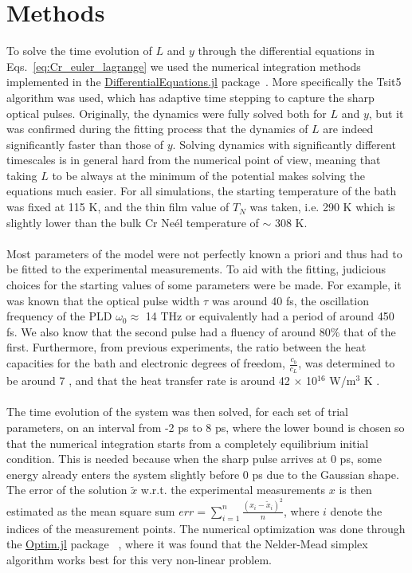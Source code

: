 \section{Methods}
To solve the time evolution of $L$ and $y$ through the differential equations in Eqs.~\ref{eq:Cr_euler_lagrange} we used the numerical integration methods implemented in the \href{https://github.com/SciML/DifferentialEquations.jl}{DifferentialEquations.jl} package~\cite{rackauckas2017differentialequations}. More specifically the Tsit5 algorithm was used, which has adaptive time stepping to capture the sharp optical pulses.
Originally, the dynamics were fully solved both for $L$ and $y$, but it was confirmed during the fitting process that the dynamics of $L$ are indeed significantly faster than those of $y$.
Solving dynamics with significantly different timescales is in general hard from the numerical point of view, meaning that taking $L$ to be always at the minimum of the potential makes solving the equations much easier.
For all simulations, the starting temperature of the bath was fixed at 115 K, and the thin film value of $T_N$ was taken, i.e. 290 K which is slightly lower than the bulk Cr Ne\'el temperature of $\sim$ 308 K.
\\\\
Most parameters of the model were not perfectly known a priori and thus had to be fitted to the experimental measurements.
To aid with the fitting, judicious choices for the starting values of some parameters were be made.
For example, it was known that the optical pulse width $\tau$ was around 40 fs, the oscillation frequency of the PLD $\omega_0 \approx$ 14 THz or equivalently had a period of around 450 fs.
We also know that the second pulse had a fluency of around 80\% that of the first.
Furthermore, from previous experiments, the ratio between the heat capacities for the bath and electronic degrees of freedom, $\frac{c_b}{c_L}$, was determined to be around 7 \cite{Nicholson2016}, and that the heat transfer rate is around 42 $\times$ 10$^{16}$ W/m$^3$ K \cite{Hostetler1999}.
\\\\
The time evolution of the system was then solved, for each set of trial parameters, on an interval from -2 ps to 8 ps, where the lower bound is chosen so that the numerical integration starts from a completely equilibrium initial condition.
This is needed because when the sharp pulse arrives at 0 ps, some energy already enters the system slightly before 0 ps due to the Gaussian shape.
The error of the solution $\tilde{x}$ w.r.t. the experimental measurements $x$ is then estimated as the mean square sum $err = \sum_{i=1}^n \frac{(x_i - \tilde{x}_i)^2}{n}$, where $i$ denote the indices of the measurement points.
The numerical optimization was done through the \href{https://github.com/JuliaNLSolvers/Optim.jl}{Optim.jl} package ~\cite{mogensen2018optim}, where it was found that the Nelder-Mead simplex algorithm \cite{Nelder1965} works best for this very non-linear problem.

